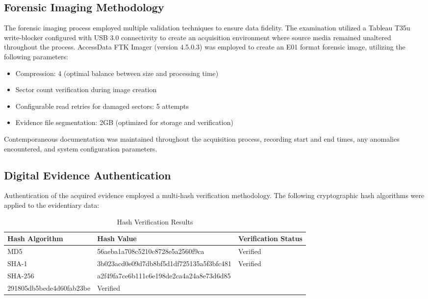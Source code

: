 \subsection{Forensic Imaging Methodology}
The forensic imaging process employed multiple validation techniques to ensure data fidelity. The examination utilized a Tableau T35u write-blocker configured with USB 3.0 connectivity to create an acquisition environment where source media remained unaltered throughout the process. AccessData FTK Imager (version 4.5.0.3) was employed to create an E01 format forensic image, utilizing the following parameters:
\begin{itemize}
    \item Compression: 4 (optimal balance between size and processing time)
    \item Sector count verification during image creation
    \item Configurable read retries for damaged sectors: 5 attempts
    \item Evidence file segmentation: 2GB (optimized for storage and verification)
\end{itemize}

Contemporaneous documentation was maintained throughout the acquisition process, recording start and end times, any anomalies encountered, and system configuration parameters.

\subsection{Digital Evidence Authentication}
Authentication of the acquired evidence employed a multi-hash verification methodology. The following cryptographic hash algorithms were applied to the evidentiary data:

\begin{table}[h]
\centering
\begin{tabular}{|p{3cm}|p{8cm}|p{3cm}|}
\hline
\textbf{Hash Algorithm} & \textbf{Hash Value} & \textbf{Verification Status} \\
\hline
MD5 & \raggedright 56aeba1a708c5210c8728e5a2560f9ca  & Verified \\
\hline
SHA-1 & \raggedright 3b023acd0e09d7db8bf5d1df725135a5f3bfc481 & Verified \\
\hline
SHA-256 & \raggedright a2f49fa7ce6b111c6e198de2ca4a24a8e73d6d85\\291805db5bede4d60fab23be  & Verified \\
\hline
\end{tabular}
\caption{Hash Verification Results}
\label{tab:hash_verification}
\end{table}


